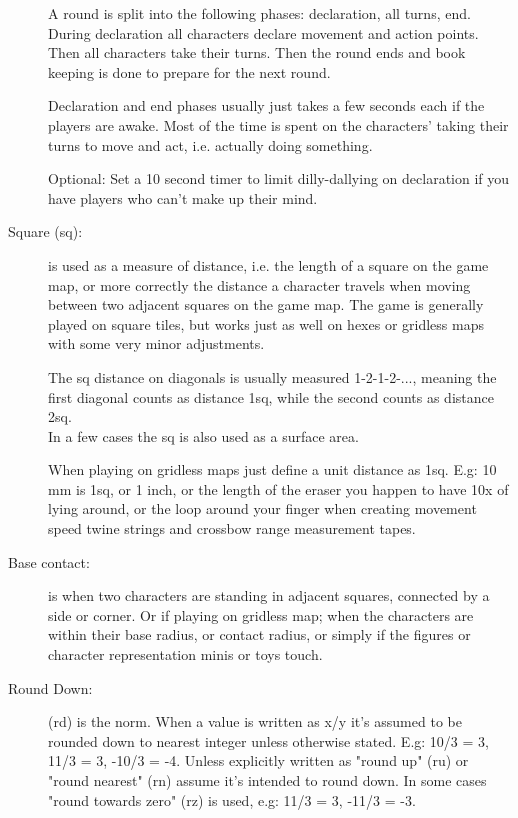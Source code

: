 \begin{description}
A round is split into the following phases: declaration, all turns, end.
During declaration all characters declare movement and action points. Then all characters take their turns. Then the round ends and book keeping is done to prepare for the next round.

Declaration and end phases usually just takes a few seconds each if the players are awake. Most of the time is spent on the characters' taking their turns to move and act, i.e. actually doing something.

Optional: Set a 10 second timer to limit dilly-dallying on declaration if you have players who can't make up their mind.


\item[Square (sq):] is used as a measure of distance, i.e. the length of a square on the game map, or more correctly the distance a character travels when moving between two adjacent squares on the game map. The game is generally played on square tiles, but works just as well on hexes or gridless maps with some very minor adjustments.

The sq distance on diagonals is usually measured 1-2-1-2-..., meaning the first diagonal counts as distance 1sq, while the second counts as distance 2sq.\\
In a few cases the sq is also used as a surface area.

When playing on gridless maps just define a unit distance as 1sq. E.g: 10 mm is 1sq, or 1 inch, or the length of the eraser you happen to have 10x of lying around, or the loop around your finger when creating movement speed twine strings and crossbow range measurement tapes.


\item[Base contact:] is when two characters are standing in adjacent squares, connected by a side or corner. Or if playing on gridless map; when the characters are within their base radius, or contact radius, or simply if the figures or character representation minis or toys touch.


\item[Round Down:] (rd) is the norm. When a value is written as x/y it's assumed to be rounded down to nearest integer unless otherwise stated. E.g: 10/3 = 3, 11/3 = 3, -10/3 = -4.
Unless explicitly written as "round up" (ru) or "round nearest" (rn) assume it's intended to round down. In some cases "round towards zero" (rz) is used, e.g: 11/3 = 3, -11/3 = -3.


\end{description}









